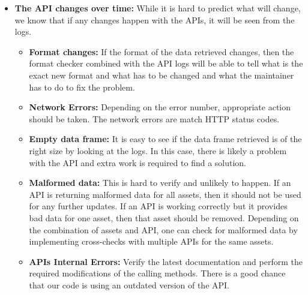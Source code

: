 \documentclass[main.tex]{subfiles}
\begin{document}
\begin{itemize}
    \item \textbf{The API changes over time: }
    While it is hard to predict what will change, we know that if any changes happen with the APIs, it will be seen from the logs. 
    \begin{itemize}
        \item \textbf{Format changes:} If the format of the data retrieved changes, then the format checker combined with the API logs will be able to tell what is the exact new format and what has to be changed and what the maintainer has to do to fix the problem.
        \item \textbf{Network Errors:}  Depending on the error number, appropriate action should be taken. The network errors are match HTTP status codes.
        \item \textbf{Empty data frame:} It is easy to see if the data frame retrieved is of the right size by looking at the logs. In this case, there is likely a problem with the API and extra work is required to find a solution.
        \item \textbf{Malformed data:} This is hard to verify and unlikely to happen.  If an API is returning malformed data for all assets, then it should not be used for any further updates. If an API is working correctly but it provides bad data for one asset, then that asset should be removed. Depending on the combination of assets and API, one can check for malformed data by implementing cross-checks with multiple APIs for the same assets.
        \item \textbf{APIs Internal Errors:} Verify the latest documentation and perform the required modifications of the calling methods. There is a good chance that our code is using an outdated version of the API.
    \end{itemize}
\end{itemize}
\end{document}
